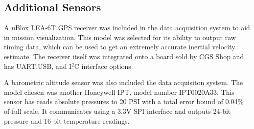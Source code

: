 \documentclass[]{aiaa-tc}%
\begin{document}
\subsection*{Additional Sensors}
A uBlox LEA-6T GPS receiver was included in the data acquisition system to aid in mission visualization. This model was selected for its ability to output raw timing data, which can be used to get an extremely accurate inertial velocity estimate\cite{ubloxDemo}. The receiver itself was integrated onto a board sold by CGS Shop and has UART,USB, and I$^2$C interface options.

A barometric altitude sensor was also included the data acquisiton system. The model chosen was another Honeywell IPT, model number IPT0020A33. This sensor has reads absolute pressures to 20 PSI with a total error bound of 0.04\% of full scale. It communicates using a 3.3V SPI interface and outputs 24-bit pressure and 16-bit temperature readings.



\end{document}
